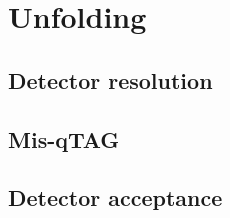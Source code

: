 \newpage
\section{Unfolding}
\subsection{Detector resolution} \label{sec:unfolding}
\subsection{Mis-qTAG}
\subsection{Detector acceptance}